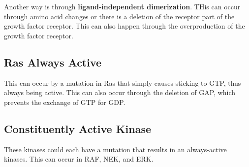\documentclass{article}
\begin{document}
Another way is through \textbf{ligand-independent dimerization}. THis can occur
through amino acid changes or there is a deletion of the receptor part of the
growth factor receptor. This can also happen through the overproduction of the
growth factor receptor.

\subsection{ Ras Always Active}

This can occur by a mutation in Ras that simply causes sticking to GTP, thus
always being active. This can also occur through the deletion of GAP, which
prevents the exchange of GTP for GDP. 

\subsection{ Constituently Active Kinase }

These kinases could each have a mutation that results in an always-active
kinases. This can occur in RAF, NEK, and ERK.
\end{document}
